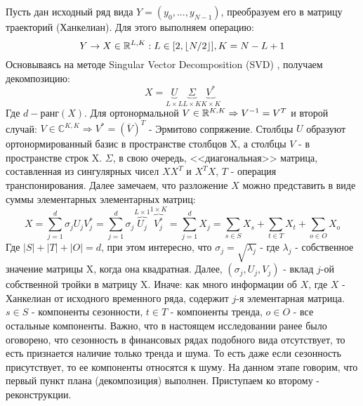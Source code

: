 Пусть дан исходный ряд вида  ${Y = (y_0, ..., y_{N - 1})}$, преобразуем его в матрицу траекторий (Ханкелиан). Для этого выполняем операцию:
\begin{equation} \label{eq::hankelisation}
	Y \rightarrow X \in \mathbb{R}^{L, K}: L \in [2, \lfloor N / 2 \rfloor], K = N - L + 1
\end{equation}
\noindent Основываясь на методе Singular Vector Decomposition (SVD) \cite{martin2012svd}, получаем декомпозицию:
\begin{equation}
	X = \underbrace{U}_{L \times L} \underbrace{\Sigma}_{L \times K} \underbrace{V^*}_{K \times K}
\end{equation}
Где ${d - \textbf{ранг}(X)}$. Для ортонормальной $V \in \mathbb{R}^{K,K} \Rightarrow V^{-1} = V^T$ и второй случай: ${V \in \mathbb{C}^{K, K} \Rightarrow V^* = \left(\overline{V}\right)^T}$ - Эрмитово сопряжение. Столбцы ${U}$ образуют ортонормированный базис в пространстве столбцов X, а столбцы ${V}$ - в пространстве строк X. ${\Sigma}$, в свою очередь, <<диагональная>> матрица, составленная из сингулярных чисел ${XX^T}$ и ${X^TX}$, $T$ - операция транспонирования. Далее замечаем, что разложение  $X$ можно представить в виде суммы элементарных элементарных матриц:
\begin{equation} \label{eq::ssa_decomposition}
	X = \sum_{j = 1}^{d} \sigma_j U_j V_j^* = \sum_{j = 1}^{d} \sigma_j \overbrace{U_j}^{L \times 1} \overbrace{V_j^*}^{1 \times K} = \sum_{j = 1}^{d} X_j = \sum_{s \in S} X_s + \sum_{t \in T} X_t + \sum_{o \in O} X_o
\end{equation}
Где $|S| + |T| + |O| = d$, при этом интересно, что $\sigma_j = \sqrt{\lambda_j}$ - где $\lambda_j$ - собственное значение матрицы X, когда она квадратная. Далее, $(\sigma_j, U_j, V_j)$ - вклад $j$-ой собственной тройки в матрицу X. Иначе: как много информации об $X$, где $X$ - Ханкелиан от исходного временного ряда, содержит $j$-я элементарная матрица. $s \in S$ - компоненты сезонности, $t \in T$ - компоненты тренда, $o \in O$ - все остальные компоненты. Важно, что в настоящем исследовании ранее было оговорено, что сезонность в финансовых рядах подобного вида отсутствует, то есть признается наличие только тренда и шума. То есть даже если сезонность присутствует, то ее компоненты относятся к шуму. На данном этапе говорим, что первый пункт плана (декомпозиция) выполнен. Приступаем ко второму - реконструкции.

